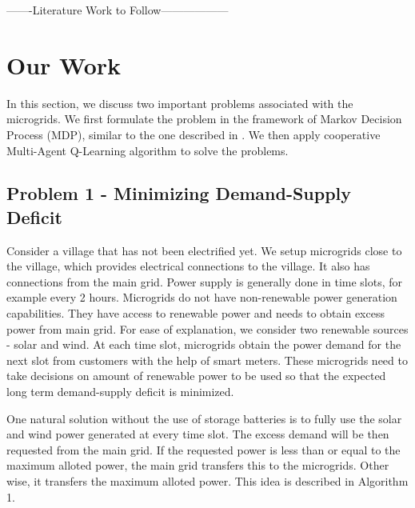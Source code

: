 \documentclass[conference]{IEEEtran}
\begin{document}
-------Literature Work to Follow------------------




\section{Our Work}
In this section, we discuss two important problems associated with the microgrids. We first formulate the problem in the framework of Markov Decision Process (MDP), similar to the one described in \cite{goodmdp}. We then apply cooperative Multi-Agent Q-Learning algorithm to solve the problems.

\subsection{Problem 1 - Minimizing Demand-Supply Deficit}

Consider a village that has not been electrified yet. We setup microgrids close to the village, which provides electrical connections to the village. It also has connections from the main grid. Power supply is generally done in time slots, for example every 2 hours. Microgrids do not have non-renewable power generation capabilities. They have access to renewable power and needs to obtain excess power from main grid. For ease of explanation, we consider two renewable sources - solar and wind. At each time slot, microgrids obtain the power demand for the next slot from customers with the help of smart meters. These microgrids need to take decisions on amount of renewable power to be used so that the expected long term demand-supply deficit is minimized.

One natural solution without the use of storage batteries is to fully use the solar and wind power generated at every time slot. The excess demand will be then requested from the main grid. If the requested power is less than or equal to the maximum alloted power, the main grid transfers this to the microgrids. Other wise, it transfers the maximum alloted power. This idea is described in Algorithm 1.
\end{document}
